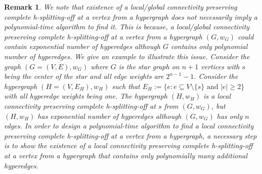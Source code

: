 \documentclass{article}
\newtheorem{remark}{Remark}[section]
\newcommand{\functionMaximizationOracleStrongCover}[1]{\ensuremath{{#1}\text{-}\mathtt{max}\text{-}\mathtt{sc}\text{-}\mathtt{Oracle}}\xspace}
\newcommand{\shubhang}[1]{{\color{blue}[{\tiny Shubhang: \bf #1}]\marginpar{\color{blue}*}}}
\newcommand{\knote}[1]{{\color{red}[{\tiny Karthik: \bf #1}]\marginpar{\color{red}*}}}
\begin{document}

\begin{remark}\label{remark:exp-sized-conn-preserving-splitting-off}
We note that existence of a local/global connectivity preserving complete h-splitting-off at a vertex from a hypergraph does not necessarily imply a polynomial-time algorithm to find it. 
This is because, 
a local/global connectivity preserving complete h-splitting-off at a vertex from a hypergraph $(G, w_G)$ could contain exponential number of hyperedges although $G$ contains only polynomial number of hyperedges. 
We give an example to illustrate this issue. 
Consider the graph $(G=(V, E), w_G)$ where $G$ is the star graph on $n+1$ vertices with $s$ being the center of the star and all edge weights are $2^{n-1}-1$. 
Consider the hypergraph $(H=(V, E_H), w_H)$ such that 
$E_H:=\{e: e\subseteq V\setminus \{s\} \text{ and } |e|\ge 2\}$ 
with all hyperedge weights being one. 
The hypergraph $(H, w_H)$ is a local connectivity preserving complete h-splitting-off at $s$ from $(G, w_G)$, but $(H, w_H)$ has exponential number of hyperedges although $(G, w_G)$ has only $n$ edges. 
In order to design a polynomial-time algorithm to find a local connectivity preserving complete h-splitting-off at a vertex from a hypergraph, a necessary step is to show the existence of a local connectivity preserving complete h-splitting-off at a vertex from a hypergraph that contains only polynomially many \emph{additional} hyperedges. 

\end{remark}
\end{document}
